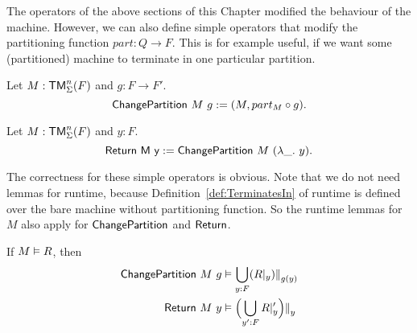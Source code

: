 The operators of the above sections of this Chapter modified the behaviour of the machine.  However, we can also define simple operators that modify
the partitioning function $part : Q \to F$.  This is for example useful, if we want some (partitioned) machine to terminate in one particular
partition.

\begin{definition}[$\MS{ChangePartition}$]
  Let $M:\mathsf{TM}_\Sigma^n(F)$ and $g : F \to F'$.
  \[ \mathsf{ChangePartition}~M~g := (M, part_M \circ g). \]
\end{definition}

\begin{definition}
  Let $M:\mathsf{TM}_\Sigma^n(F)$ and $y:F$.
  \[ \mathsf{Return~M~y} := \mathsf{ChangePartition}~M~(\lambda \_.~y). \]
\end{definition}

The correctness for these simple operators is obvious.  Note that we do not need lemmas for runtime, because Definition~\ref{def:TerminatesIn} of
runtime is defined over the bare machine without partitioning function.  So the runtime lemmas for $M$ also apply for $\MS{ChangePartition}$ and
$\mathsf{Return}$.
\begin{lemma}
  If $M \mathrel{\vDash} R$, then
  \begin{alignat*}{1}
    \mathsf{ChangePartition}~M~g & \mathrel{\vDash} \bigcup_{y:F} (R {|}_{y}) {|\mkern-1.5mu|}_{g(y)} \\
    \mathsf{Return}~M~y          & \mathrel{\vDash} \Bigl( \bigcup_{y':F} R {|}_{y}' \Bigr) {|\mkern-1.5mu|}_{y}
  \end{alignat*}
\end{lemma}


